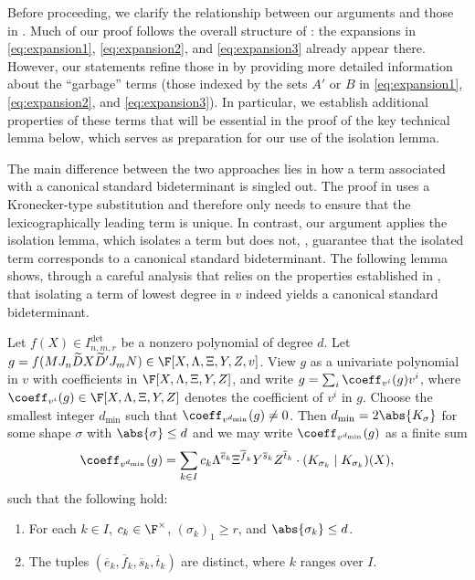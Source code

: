 \documentclass[letterpaper, 11pt]{amsart}
\begin{document}
Before proceeding, we clarify the relationship between our arguments and those in \cite{AF21}.
Much of our proof follows the overall structure of \cite{AF21}: the expansions in \eqref{eq:expansion1}, \eqref{eq:expansion2}, and \eqref{eq:expansion3} already appear there.
However, our statements refine those in \cite{AF21} by providing more detailed information about the ``garbage'' terms (those indexed by the sets $A'$ or $B$ in \eqref{eq:expansion1}, \eqref{eq:expansion2}, and \eqref{eq:expansion3}). In particular, we establish additional properties of these terms that will be essential in the proof of the key technical lemma below, which serves as preparation for our use of the isolation lemma. 

The main difference between the two approaches lies in how a term associated with a canonical standard bideterminant is singled out.
The proof in \cite{AF21} uses a Kronecker-type substitution and therefore only needs to ensure that the lexicographically leading term is unique.
In contrast, our argument applies the isolation lemma, which isolates a term but does not, \apriori, guarantee that the isolated term corresponds to a canonical standard bideterminant.
The following lemma shows, through a careful analysis that relies on the properties established in , that isolating a term of lowest degree in $v$ indeed yields a canonical standard bideterminant.

\begin{lem}\label{lem:key}
Let $f(X) \in I^{\det}_{n, m, r}$ be a nonzero polynomial of degree $d$.
Let $g = f(M J_n \widetilde{D} X \widetilde{D}' J_m N) \in \F[X, \Lambda, \Xi, Y, Z, v]$.
View $g$ as a univariate polynomial in $v$ with coefficients in $\F[X,\Lambda,\Xi,Y,Z]$, and write $g=\sum_{i} \coeff_{v^i}(g) v^i$, where $\coeff_{v^i}(g)\in \F[X,\Lambda,\Xi,Y,Z]$ denotes the coefficient of $v^i$ in $g$.
Choose the smallest integer $d_{\min}$ such that  $\coeff_{v^{d_{\min}}}(g)\neq 0$.
Then $d_{\min}=2 \abs{K_\sigma}$ for some shape $\sigma$ with $\abs{\sigma} \leq d$ and we may write $\coeff_{v^{d_{\min}}}(g)$ as a finite sum
\begin{equation}\label{eq:required}
    \coeff_{v^{d_{\min}}}(g)=\sum_{k\in I} c_k \Lambda^{\overline{e}_k}\Xi^{\overline{f}_k}Y^{\overline{s}_k}Z^{\overline{t}_k}\cdot (K_{\sigma_k}\mid K_{\sigma_k})(X), 
\end{equation}
such that the following hold:
\begin{enumerate}
    \item\label{item:required1} For each $k\in I$, $c_k\in\F^\times$,  $(\sigma_k)_1\geq r$, and $\abs{\sigma_k} \leq d$.
    \item\label{item:required2} The tuples $(\overline{e}_k,\overline{f}_k, \overline{s}_k,\overline{t}_k)$ are distinct, where $k$ ranges over $I$.
\end{enumerate}
\end{lem}
\end{document}
